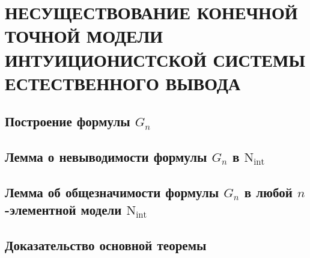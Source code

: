 \section{\uppercase{Несуществование конечной точной модели интуиционистской системы естественного вывода}}

\subsection{Построение формулы $G_n$}

\newpage

\subsection{Лемма о невыводимости формулы $G_n$ в $\text{N}_\text{int}$}

\newpage

\subsection{Лемма об общезначимости формулы $G_n$ в любой $n$-элементной модели $\text{N}_\text{int}$}

\newpage

\subsection{Доказательство основной теоремы}
